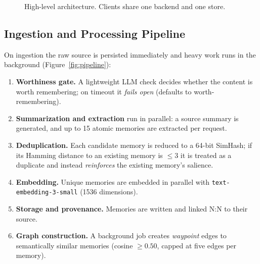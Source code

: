 \documentclass[conference]{IEEEtran}
\begin{document}
\begin{figure}[t]
\centering
{}
\caption{High-level architecture. Clients share one backend and one store.}
\label{fig:arch}
\end{figure}

\subsection{Ingestion and Processing Pipeline}
On ingestion the raw source is persisted immediately and heavy work runs in the
background (Figure~\ref{fig:pipeline}):
\begin{enumerate}
\item \textbf{Worthiness gate.} A lightweight LLM check decides whether the
content is worth remembering; on timeout it \emph{fails open} (defaults to
worth-remembering).
\item \textbf{Summarization and extraction} run in parallel: a source summary
is generated, and up to 15 atomic memories are extracted per request.
\item \textbf{Deduplication.} Each candidate memory is reduced to a 64-bit
SimHash; if its Hamming distance to an existing memory is $\le 3$ it is treated
as a duplicate and instead \emph{reinforces} the existing memory's salience.
\item \textbf{Embedding.} Unique memories are embedded in parallel with
\texttt{text-embedding-3-small} (1536 dimensions).
\item \textbf{Storage and provenance.} Memories are written and linked N:N to
their source.
\item \textbf{Graph construction.} A background job creates
\emph{waypoint} edges to semantically similar memories (cosine $\ge 0.50$,
capped at five edges per memory).
\end{enumerate}
\end{document}
